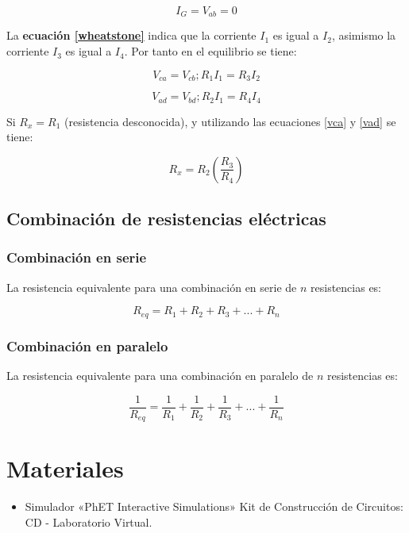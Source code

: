 \documentclass[letter,11pt]{article}
\begin{document}
\begin{equation}
    I_G = V_{ab} = 0
\label{wheatstone}
\end{equation}

La \textbf{ecuación \ref{wheatstone}} indica que la corriente $I_1$ es igual a
$I_2$, asimismo la corriente $I_3$ es igual a $I_4$. Por tanto en el equilibrio
se tiene:

\begin{equation}
    V_{ca} = V_{cb}; R_1 I_1 = R_3 I_2
\label{vca}
\end{equation}

\begin{equation}
    V_{ad} = V_{bd}; R_2 I_1 = R_4 I_4
\label{vad}
\end{equation}

Si $R_x = R_1$ (resistencia desconocida), y utilizando las ecuaciones
\ref{vca} y \ref{vad} se tiene:

\begin{equation}
    R_x = R_2 \left(\frac{R_3}{R_4}\right)
\label{rx}
\end{equation}

\subsection{Combinación de resistencias eléctricas}

\subsubsection{Combinación en serie}
La resistencia equivalente para una combinación en serie de $n$ resistencias es:

\begin{equation}
    R_{eq} = R_1 + R_2 + R_3 + ... + R_n
\label{serie}
\end{equation}

\subsubsection{Combinación en paralelo}
La resistencia equivalente para una combinación en paralelo de $n$ resistencias
es:

\begin{equation}
    \frac{1}{R_{eq}} = \frac{1}{R_1} + \frac{1}{R_2} + \frac{1}{R_3} + ... + \frac{1}{R_n}
\label{paralelo}
\end{equation}

\section{Materiales}
\begin{itemize}
\item Simulador «PhET Interactive Simulations» Kit de Construcción de Circuitos:
CD - Laboratorio Virtual.
\end{itemize}
\end{document}
